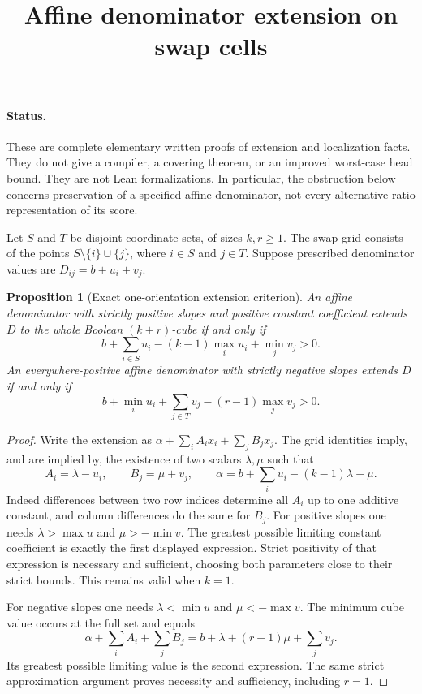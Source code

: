 \documentclass[11pt]{article}
\newtheorem{proposition}{Proposition}
\begin{document}
\title{Affine denominator extension on swap cells}
\author{}
\date{}
\maketitle
\paragraph{Status.}
These are complete elementary written proofs of extension and localization
facts. They do not give a compiler, a covering theorem, or an improved
worst-case head bound. They are not Lean formalizations. In particular,
the obstruction below concerns preservation of a specified affine
denominator, not every alternative ratio representation of its score.

Let $S$ and $T$ be disjoint coordinate sets, of sizes $k,r\geq1$.
The swap grid consists of the points $S\setminus\{i\}\cup\{j\}$,
where $i\in S$ and $j\in T$. Suppose prescribed denominator values are
$D_{ij}=b+u_i+v_j$.

\begin{proposition}[Exact one-orientation extension criterion]
An affine denominator with strictly positive slopes and positive constant
coefficient extends $D$ to the whole Boolean $(k+r)$-cube if and only if
\[
 b+\sum_{i\in S}u_i-(k-1)\max_i u_i+\min_jv_j>0.
\]
An everywhere-positive affine denominator with strictly negative slopes
extends $D$ if and only if
\[
 b+\min_i u_i+\sum_{j\in T}v_j-(r-1)\max_jv_j>0.
\]
\end{proposition}
\begin{proof}
Write the extension as $\alpha+\sum_i A_ix_i+\sum_jB_jx_j$.
The grid identities imply, and are implied by, the existence of two
scalars $\lambda,\mu$ such that
\[
 A_i=\lambda-u_i,\qquad B_j=\mu+v_j,\qquad
 \alpha=b+\sum_i u_i-(k-1)\lambda-\mu.
\]
Indeed differences between two row indices determine all $A_i$ up to
one additive constant, and column differences do the same for $B_j$.
For positive slopes one needs $\lambda>\max u$ and
$\mu>-\min v$. The greatest possible limiting constant coefficient is
exactly the first displayed expression. Strict positivity of that
expression is necessary and sufficient, choosing both parameters close
to their strict bounds. This remains valid when $k=1$.

For negative slopes one needs $\lambda<\min u$ and
$\mu<-\max v$. The minimum cube value occurs at the full set and equals
\[
 \alpha+\sum_iA_i+\sum_jB_j
 =b+\lambda+(r-1)\mu+\sum_jv_j.
\]
Its greatest possible limiting value is the second expression. The same
strict approximation argument proves necessity and sufficiency,
including $r=1$.
\end{proof}
\end{document}
